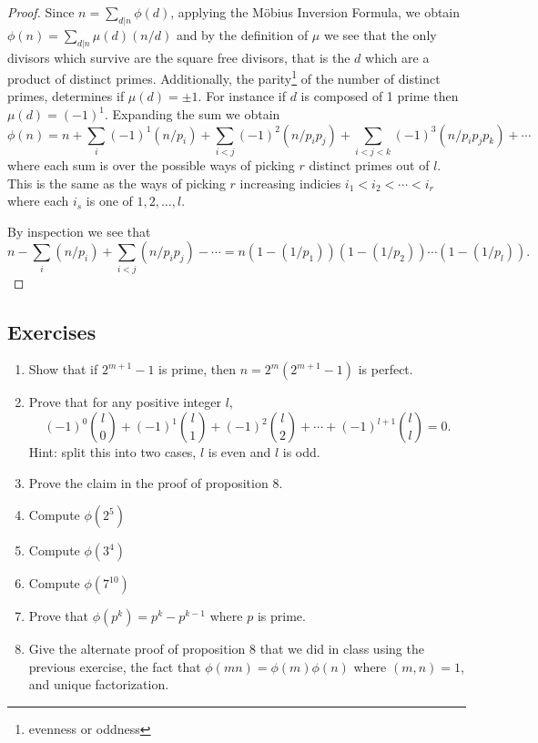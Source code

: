 \documentclass{article}
\theoremstyle{problemstyle}
\begin{document}
\begin{proof}
Since $n = \sum_{d|n}\phi(d)$, applying the M\"obius Inversion Formula, we obtain $\phi(n) = \sum_{d|n}\mu(d)(n/d)$ and by the definition of $\mu$ we see that the only divisors which survive are the square free divisors, that is the $d$ which are a product of distinct primes. Additionally, the parity\footnote{evenness or oddness} of the number of distinct primes, determines if $\mu(d) = \pm 1$. For instance if $d$ is composed of 1 prime then $\mu(d) = (-1)^1$. Expanding the sum we obtain $$\phi(n) = n + \sum_i(-1)^1(n/p_i) + \sum_{i < j}(-1)^2(n/p_ip_j) + \sum_{i < j< k}(-1)^3(n/p_ip_jp_k) + \cdots $$ where each sum is over the possible ways of picking $r$ distinct primes out of $l$. This is the same as the ways of picking $r$ increasing indicies $i_1 < i_2 < \cdots < i_r$  where each $i_s$ is one of $1,2,\ldots,l$. 

By inspection we see that $$n - \sum_i(n/p_i) + \sum_{i < j}(n/p_ip_j) - \cdots = n(1-(1/p_1))(1-(1/p_2))\cdots(1-(1/p_l)).$$
\end{proof}


\subsection*{Exercises}
\begin{enumerate}
\item Show that if $2^{m+1}-1$ is prime, then $n = 2^m(2^{m+1}-1)$ is perfect.
\item Prove that for any positive integer $l$, $$(-1)^0\binom{l}{0} + (-1)^1\binom{l}{1} + (-1)^2\binom{l}{2}+\cdots+(-1)^{l+1}\binom{l}{l} = 0.$$ Hint: split this into two cases, $l$ is even and $l$ is odd.   
\item Prove the claim in the proof of proposition 8. 
\item Compute $\phi(2^5)$
\item Compute $\phi(3^4)$
\item Compute $\phi(7^{10})$
\item Prove that $\phi(p^k) = p^k - p^{k-1}$ where $p$ is prime. 
\item Give the alternate proof of proposition 8 that we did in class using the previous exercise, the fact that $\phi(mn) = \phi(m)\phi(n)$ where $(m,n) = 1$, and unique factorization. 
\end{enumerate}
\end{document}

